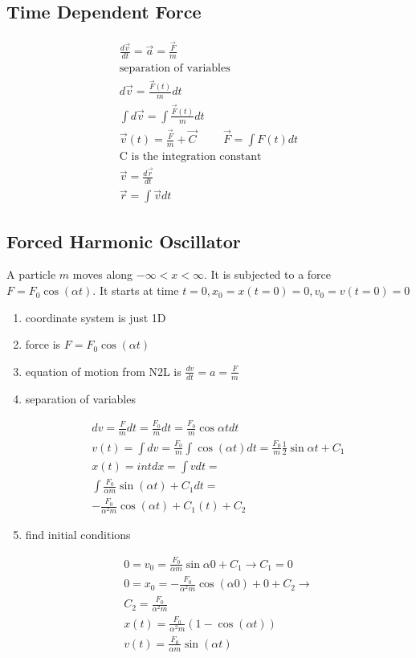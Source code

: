 \documentclass[fleqn]{report}
\newcommand{\hp}{\hspace{1cm}}
\newcommand{\equations} [1] {
\begin{gather*}
#1
\end{gather*}
}
\begin{document}
\subsection{Time Dependent Force}
\equations{
\frac{d \vec v}{dt} = \vec a = \frac{\vec F}{m}
\\
\textrm{separation of variables}
\\
d \vec v = \frac{\vec F(t)}{m} dt 
\\
\int d \vec v = \int \frac{\vec F(t)}{m} dt
\\
\vec v(t) = \frac{\vec F}{m} + \vec C \hp \vec F = \int F(t) dt
\\
\textrm{C is the integration constant}
\\
\vec v = \frac{d \vec r}{dt}
\\
\vec r = \int \vec v dt
}

\subsection{Forced Harmonic Oscillator}
A particle $m$ moves along $-\infty < x <\infty$. It is subjected to a force 
$F = F_0 \cos(\alpha t)$.
It starts at time $t = 0, x_0 = x(t = 0) = 0, v_0 = v(t = 0) = 0$

\begin{enumerate}
\item
coordinate system is just 1D
\item
force is $F = F_0 \cos(\alpha t)$
\item
equation of motion from N2L is $\frac{dv}{dt} = a = \frac{F}{m}$
\item
separation of variables
\equations{
    dv = \frac{F}{m} dt = \frac{F_0}{m} dt = \frac{F_0}{m} \cos{\alpha t} dt
    \\
    v(t) = \int dv = \frac{F_0}{m} \int \cos(\alpha t) dt = 
    \frac{F_0}{m} \frac{1}{2} \sin{\alpha t} + C_1
    \\
    x(t) = int dx = \int v dt =
    \\
    \int \frac{F_0}{\alpha m} \sin(\alpha t) + C_1 dt =
    \\
    - \frac{F_0}{\alpha^2 m} \cos(\alpha t) + C_1(t) + C_2
}
\item
find initial conditions

\equations{
0 = v_0 = \frac{F_0}{\alpha m} \sin{\alpha 0} + C_1 \rightarrow C_1 = 0
\\
0 = x_0 = - \frac{F_0}{\alpha^2 m} \cos(\alpha 0) + 0 + C_2 \rightarrow 
\\
C_2 = \frac{F_0}{\alpha^2 m}
\\
x(t) = \frac{F_0}{\alpha^2 m} \left(1 - \cos(\alpha t) \right)
\\
v(t) = \frac{F_0}{\alpha m} \sin(\alpha t)
}
\end{enumerate}
\end{document}
